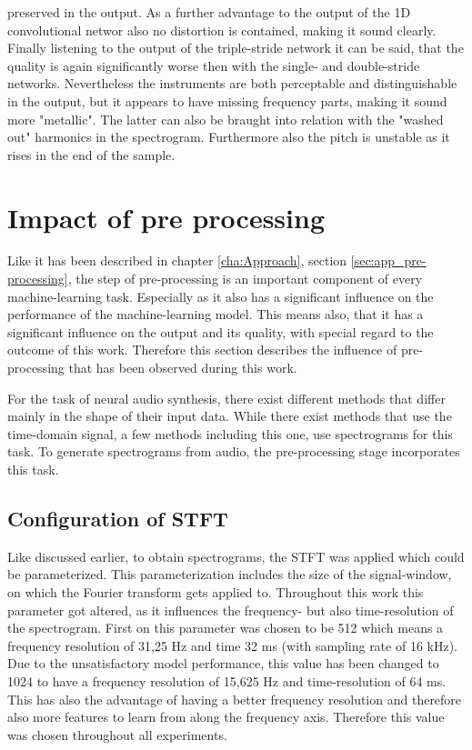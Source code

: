 preserved in the output. As a further advantage to the output of the 1D convolutional networ also no distortion is contained, making it sound clearly. Finally listening to the output of the triple-stride network it can be said, that the quality is again significantly worse then with the single- and double-stride networks. Nevertheless the instruments are both perceptable and distinguishable in the output, but it appears to have missing frequency parts, making it sound more "metallic". The latter can also be braught into relation with the "washed out" harmonics in the spectrogram. Furthermore also the pitch is unstable as it rises in the end of the sample. 




\section{Impact of pre processing}
\label{sec:disc_imp_pre_processing}

Like it has been described in chapter \ref{cha:Approach}, section \ref{sec:app_pre-processing}, the step of pre-processing is an important component of every machine-learning task. Especially as it also has a significant influence on the performance of the machine-learning model. This means also, that it has a significant influence on the output and its quality, with special regard to the outcome of this work. Therefore this section describes the influence of pre-processing that has been observed during this work. 

For the task of neural audio synthesis, there exist different methods that differ mainly in the shape of their input data. While there exist methods that use the time-domain signal, a few methods including this one, use spectrograms for this task. To generate spectrograms from audio, the pre-processing stage incorporates this task. 

\subsection{Configuration of STFT}
Like discussed earlier, to obtain spectrograms, the STFT was applied which could be parameterized. This parameterization includes the size of the signal-window, on which the Fourier transform gets applied to. Throughout this work this parameter got altered, as it influences the frequency- but also time-resolution of the spectrogram. First on this parameter was chosen to be 512 which means a frequency resolution of 31,25 Hz and time 32 ms (with sampling rate of 16 kHz). Due to the unsatisfactory model performance, this value has been changed to 1024 to have a frequency resolution of 15,625 Hz and time-resolution of 64 ms. This has also the advantage of having a better frequency resolution and therefore also more features to learn from along the frequency axis. Therefore this value was chosen throughout all experiments.

